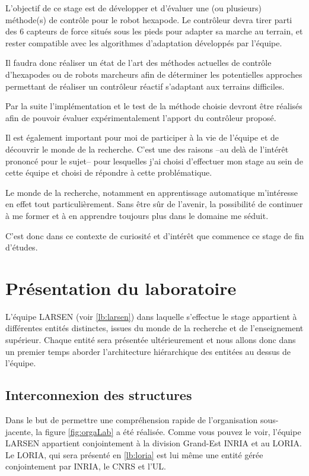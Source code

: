 \documentclass{tnreport}
\begin{document}
L'objectif de ce stage est de développer et d'évaluer une (ou plusieurs) méthode(s) de contrôle pour le robot hexapode. Le contrôleur devra tirer parti des 6 capteurs de force situés sous les pieds pour adapter sa marche au terrain, et rester compatible avec les algorithmes d'adaptation développés par l'équipe.

Il faudra donc réaliser un état de l'art des méthodes actuelles de contrôle d'hexapodes ou de robots marcheurs afin de déterminer les potentielles approches permettant de réaliser un contrôleur réactif s'adaptant aux terrains difficiles. 

Par la suite l'implémentation et le test de la méthode choisie devront être réalisés afin de pouvoir évaluer expérimentalement l'apport du contrôleur proposé. 

Il est également important pour moi de participer à la vie de l'équipe et de découvrir le monde de la recherche. C'est une des raisons --au delà de l'intérêt prononcé pour le sujet-- pour lesquelles j'ai choisi d'effectuer mon stage au sein de cette équipe et choisi de répondre à cette problématique. 

Le monde de la recherche, notamment en apprentissage automatique m'intéresse en effet tout particulièrement. Sans être sûr de l'avenir, la possibilité de continuer à me former et à en apprendre toujours plus dans le domaine me séduit. 

C'est donc dans ce contexte de curiosité et d'intérêt que commence ce stage de fin d'études.


\newpage
\section{Présentation du laboratoire}
L'équipe \gls{LARSEN} (voir \ref{lb:larsen}) dans laquelle s'effectue le stage appartient à différentes entités distinctes, issues du monde de la recherche et de l'enseignement supérieur. Chaque entité sera présentée ultérieurement et nous allons donc dans un premier temps aborder l'architecture hiérarchique des entitées au dessus de l'équipe. 

\subsection{Interconnexion des structures} \label{lb:interstructures}
Dans le but de permettre une compréhension rapide de l'organisation sous-jacente, la figure \ref{fig:orgaLab} a été réalisée. Comme vous pouvez le voir, l'équipe \gls{LARSEN} appartient conjointement à la division Grand-Est \gls{INRIA} et au \gls{LORIA}. Le \gls{LORIA}, qui sera présenté en \ref{lb:loria} est lui même une entité gérée conjointement par \gls{INRIA}, le \gls{CNRS} et l'\gls{UL}.  
\end{document}
